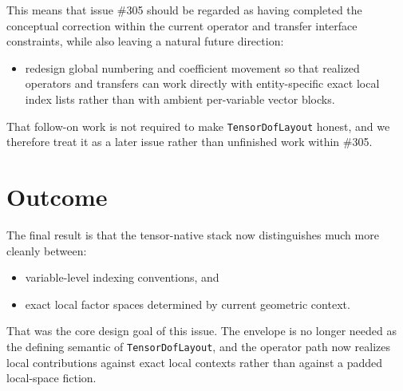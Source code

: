 \documentclass[11pt]{article}
\begin{document}
This means that issue \#305 should be regarded as having completed the conceptual correction within the current operator and transfer interface constraints, while also leaving a natural future direction:
\begin{itemize}[leftmargin=*]
  \item redesign global numbering and coefficient movement so that realized operators and transfers can work directly with entity-specific exact local index lists rather than with ambient per-variable vector blocks.
\end{itemize}

That follow-on work is not required to make \texttt{TensorDofLayout} honest, and we therefore treat it as a later issue rather than unfinished work within \#305.

\section{Outcome}

The final result is that the tensor-native stack now distinguishes much more cleanly between:
\begin{itemize}[leftmargin=*]
  \item variable-level indexing conventions, and
  \item exact local factor spaces determined by current geometric context.
\end{itemize}

That was the core design goal of this issue.  The envelope is no longer needed as the defining semantic of \texttt{TensorDofLayout}, and the operator path now realizes local contributions against exact local contexts rather than against a padded local-space fiction.
\end{document}
